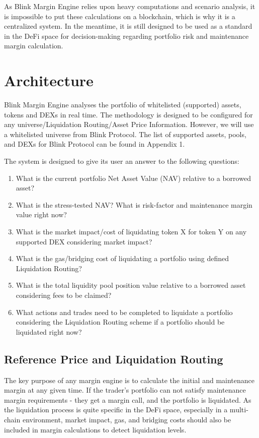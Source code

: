 \documentclass[letterpaper, 12pt]{article}
\begin{document}
As Blink Margin Engine relies upon heavy computations and scenario analysis, it is impossible to put these calculations on a blockchain, which is why it is a centralized system. In the meantime, it is still designed to be used as a standard in the DeFi space for decision-making regarding portfolio risk and maintenance margin calculation. 

\section {Architecture}

Blink Margin Engine analyses the portfolio of whitelisted (supported) assets, tokens and DEXs in real time. 
The methodology is designed to be configured for any universe/Liquidation Routing/Asset Price Information. However, we will use a whitelisted universe from Blink Protocol. The list of supported assets, pools, and DEXs for Blink Protocol can be found in Appendix 1.

The system is designed to give its user an answer to the following questions:
  \begin{enumerate}
  \item What is the current portfolio Net Asset Value (NAV) relative to a borrowed asset?
  \item What is the stress-tested NAV? What is risk-factor and maintenance margin value right now?
  \item What is the market impact/cost of liquidating token X for token Y on any supported DEX considering market impact?
  \item What is the gas/bridging cost of liquidating a portfolio using defined Liquidation Routing?
  \item What is the total liquidity pool position value relative to a borrowed asset considering fees to be claimed?
  \item What actions and trades need to be completed to liquidate a portfolio considering the Liquidation Routing scheme if a portfolio should be liquidated right now?
  \end{enumerate}


\subsection{Reference Price and Liquidation Routing}
The key purpose of any margin engine is to calculate the initial and maintenance margin at any given time. If the trader's portfolio can not satisfy maintenance margin requirements -  they get a margin call, and the portfolio is liquidated. As the liquidation process is quite specific in the DeFi space, especially in a multi-chain environment, market impact, gas, and bridging costs should also be included in margin calculations to detect liquidation levels.
\end{document}

